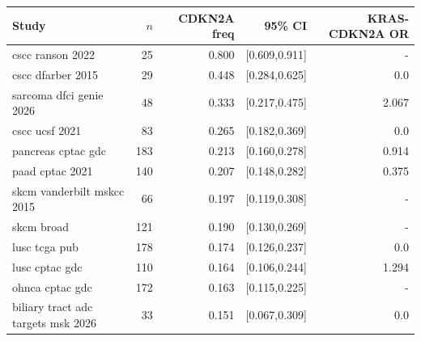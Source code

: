 \begin{tabular}{lrrrr}
\hline
Study & $n$ & CDKN2A freq & 95\% CI & KRAS-CDKN2A OR \\
\hline
cscc ranson 2022 & 25 & 0.800 & [0.609,0.911] & - \\
cscc dfarber 2015 & 29 & 0.448 & [0.284,0.625] & 0.0 \\
sarcoma dfci genie 2026 & 48 & 0.333 & [0.217,0.475] & 2.067 \\
cscc ucsf 2021 & 83 & 0.265 & [0.182,0.369] & 0.0 \\
pancreas cptac gdc & 183 & 0.213 & [0.160,0.278] & 0.914 \\
paad cptac 2021 & 140 & 0.207 & [0.148,0.282] & 0.375 \\
skcm vanderbilt mskcc 2015 & 66 & 0.197 & [0.119,0.308] & - \\
skcm broad & 121 & 0.190 & [0.130,0.269] & - \\
lusc tcga pub & 178 & 0.174 & [0.126,0.237] & 0.0 \\
lusc cptac gdc & 110 & 0.164 & [0.106,0.244] & 1.294 \\
ohnca cptac gdc & 172 & 0.163 & [0.115,0.225] & - \\
biliary tract adc targets msk 2026 & 33 & 0.151 & [0.067,0.309] & 0.0 \\
\hline
\end{tabular}
